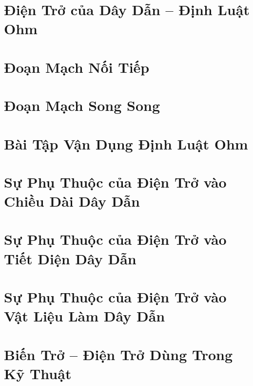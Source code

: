 \documentclass{article}
\begin{document}
\section{Điện Trở của Dây Dẫn -- Định Luật Ohm}


\section{Đoạn Mạch Nối Tiếp}


\section{Đoạn Mạch Song Song}


\section{Bài Tập Vận Dụng Định Luật Ohm}


\section{Sự Phụ Thuộc của Điện Trở vào Chiều Dài Dây Dẫn}


\section{Sự Phụ Thuộc của Điện Trở vào Tiết Diện Dây Dẫn}


\section{Sự Phụ Thuộc của Điện Trở vào Vật Liệu Làm Dây Dẫn}


\section{Biến Trở -- Điện Trở Dùng Trong Kỹ Thuật}
\end{document}
